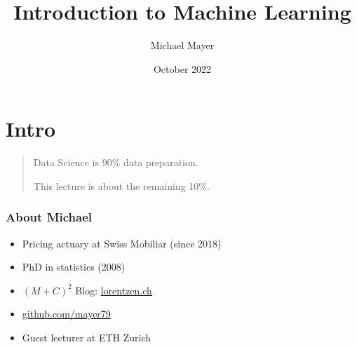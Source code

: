 \documentclass[
    utf8,
    aspectratio=169
]{beamer}  %
\title{Introduction to Machine Learning}
\author{Michael Mayer}
\date{October 2022}
\begin{document}

\frame{\titlepage}


\section{Intro}

\begin{frame}
\begin{quotation}
	\begin{huge}
		\begin{center}
			Data Science is 90\% data preparation.
	
			This lecture is about the remaining 10\%.
		\end{center}
	\end{huge}
\end{quotation}
\end{frame}

\begin{frame}
	\frametitle{About Michael}
	\begin{itemize}
		\item Pricing actuary at Swiss Mobiliar (since 2018)
		\item PhD in statistics (2008)
		\item $(M+C)^2$ Blog: \url{lorentzen.ch}
		\item \url{github.com/mayer79}
		\item Guest lecturer at ETH Zurich
	\end{itemize}
\end{frame}
\end{document}
